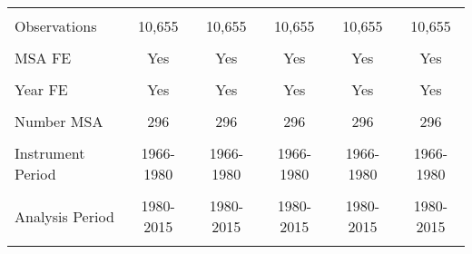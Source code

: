 \begin{tabular}{lccccc}
    \vspace{4pt} & \begin{footnotesize}\end{footnotesize} & \begin{footnotesize}\end{footnotesize} & \begin{footnotesize}\end{footnotesize} & \begin{footnotesize}\end{footnotesize} & \begin{footnotesize}\end{footnotesize} \\
    Observations & 10,655 & 10,655 & 10,655 & 10,655 & 10,655 \\
    \vspace{-2pt} & \vspace{-2pt} & \vspace{-2pt} & \vspace{-2pt} & \vspace{-2pt} \\
    MSA FE & Yes & Yes & Yes & Yes & Yes \\
    \vspace{-2pt} & \vspace{-2pt} & \vspace{-2pt} & \vspace{-2pt} & \vspace{-2pt} \\
    Year FE & Yes & Yes & Yes & Yes & Yes \\
    \vspace{-2pt} & \vspace{-2pt} & \vspace{-2pt} & \vspace{-2pt} & \vspace{-2pt} \\
    Number MSA & 296 & 296 & 296 & 296 & 296 \\
    \vspace{-2pt} & \vspace{-2pt} & \vspace{-2pt} & \vspace{-2pt} & \vspace{-2pt} \\
    Instrument Period & 1966-1980 & 1966-1980 & 1966-1980 & 1966-1980 & 1966-1980 \\
    \vspace{-2pt} & \vspace{-2pt} & \vspace{-2pt} & \vspace{-2pt} & \vspace{-2pt} \\
    Analysis Period & 1980-2015 & 1980-2015 & 1980-2015 & 1980-2015 & 1980-2015 \\ 
    \vspace{-2pt} & \vspace{-2pt} & \vspace{-2pt} & \vspace{-2pt} & \vspace{-2pt} \\ \hline
    

\end{tabular}
